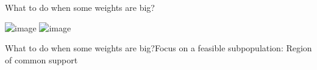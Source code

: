 \documentclass{beamer}
\begin{document}
\begin{frame}{What to do when some weights are big?}

\includegraphics<1>[width = \textwidth]{figures/very_unequal_weight_histogram}
\includegraphics<2>[width = \textwidth]{figures/very_unequal_weight_cdf}

\end{frame}

\begin{frame}{What to do when some weights are big?}{Focus on a feasible subpopulation: Region of common support}

\end{frame}
\end{document}
